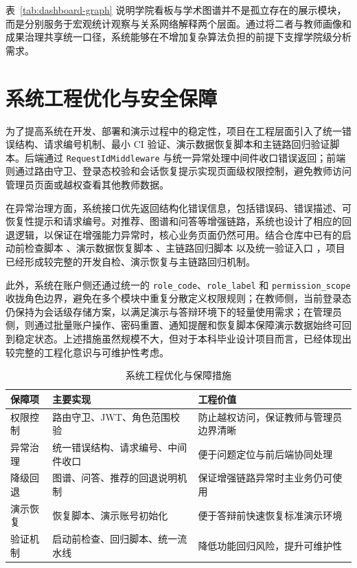 \documentclass[12pt,a4paper]{ctexbook}
\begin{document}
表~\ref{tab:dashboard-graph} 说明学院看板与学术图谱并不是孤立存在的展示模块，而是分别服务于宏观统计观察与关系网络解释两个层面。通过将二者与教师画像和成果治理共享统一口径，系统能够在不增加复杂算法负担的前提下支撑学院级分析需求。

\section{系统工程优化与安全保障}
为了提高系统在开发、部署和演示过程中的稳定性，项目在工程层面引入了统一错误结构、请求编号机制、最小 CI 验证、演示数据恢复脚本和主链路回归验证脚本。后端通过 \texttt{RequestIdMiddleware} 与统一异常处理中间件收口错误返回；前端则通过路由守卫、登录态校验和会话恢复提示实现页面级权限控制，避免教师访问管理员页面或越权查看其他教师数据。

在异常治理方面，系统接口优先返回结构化错误信息，包括错误码、错误描述、可恢复性提示和请求编号。对推荐、图谱和问答等增强链路，系统也设计了相应的回退逻辑，以保证在增强能力异常时，核心业务页面仍然可用。结合仓库中已有的启动前检查脚本 、演示数据恢复脚本 、主链路回归脚本  以及统一验证入口 ，项目已经形成较完整的开发自检、演示恢复与主链路回归机制。

此外，系统在账户侧还通过统一的 \texttt{role\_code}、\texttt{role\_label} 和 \texttt{permission\_scope} 收拢角色边界，避免在多个模块中重复分散定义权限规则；在教师侧，当前登录态仍保持为会话级存储方案，以满足演示与答辩环境下的轻量使用需求；在管理员侧，则通过批量账户操作、密码重置、通知提醒和恢复脚本保障演示数据始终可回到稳定状态。上述措施虽然规模不大，但对于本科毕业设计项目而言，已经体现出较完整的工程化意识与可维护性考虑。

\begin{table}[H]
  \centering
  \small
  \caption{系统工程优化与保障措施}
  \label{tab:engineering-safeguards}
  \begin{tabular}{p{3cm}p{3cm}p{5.2cm}}
    \toprule
    保障项 & 主要实现 & 工程价值 \\
    \midrule
    权限控制 & 路由守卫、JWT、角色范围校验 & 防止越权访问，保证教师与管理员边界清晰 \\
    异常治理 & 统一错误结构、请求编号、中间件收口 & 便于问题定位与前后端协同处理 \\
    降级回退 & 图谱、问答、推荐的回退说明机制 & 保证增强链路异常时主业务仍可使用 \\
    演示恢复 & 恢复脚本、演示账号初始化 & 便于答辩前快速恢复标准演示环境 \\
    验证机制 & 启动前检查、回归脚本、统一流水线 & 降低功能回归风险，提升可维护性 \\
    \bottomrule
  \end{tabular}
\end{table}
\end{document}
